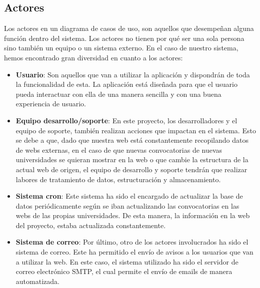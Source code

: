 \subsection{Actores}
Los actores en un diagrama de casos de uso, son aquellos que desempeñan alguna función dentro del sistema. Los actores no tienen por qué ser una sola persona sino también un equipo o un sistema externo. En el caso de nuestro sistema, hemos encontrado gran diversidad en cuanto a los actores:

\begin{itemize}
\item\textbf{Usuario}: Son aquellos que van a utilizar la aplicación y dispondrán de toda la funcionalidad de esta. La aplicación está diseñada para que el usuario pueda interactuar con ella de una manera sencilla y con una buena experiencia de usuario.
\item\textbf{Equipo desarrollo/soporte}: En este proyecto, los desarrolladores y el equipo de soporte, también realizan acciones que impactan en el sistema. Esto se debe a que, dado que nuestra web está constantemente recopilando datos de webs externas, en el caso de que nuevas convocatorias de nuevas universidades se quieran mostrar en la web o que cambie la estructura de la actual web de origen, el equipo de desarrollo y soporte tendrán que realizar labores de tratamiento de datos, estructuración y almacenamiento.
\item\textbf{Sistema cron}: Este sistema ha sido el encargado de actualizar la base de datos periódicamente según se iban actualizando las convocatorias en las webs de las propias universidades. De esta manera, la información en la web del proyecto, estaba actualizada constantemente.
\item\textbf{Sistema de correo}: Por último, otro de los actores involucrados ha sido el sistema de correo. Este ha permitido el envío de avisos a los usuarios que van a utilizar la web. En este caso, el sistema utilizado ha sido el servidor de correo electrónico SMTP, el cual permite el envío de emails de manera automatizada.
\end{itemize}


